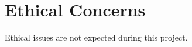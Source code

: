 \section{Ethical Concerns}
\label{chap:ethical_concerns}
Ethical issues are not expected during this project.
